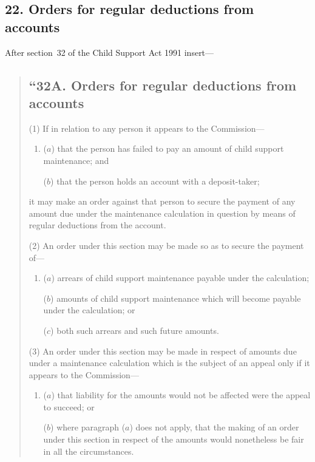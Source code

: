 \documentclass[12pt,a4paper]{article}
\begin{document}

\subsection{22. Orders for regular deductions from accounts}

After section~32 of the Child Support Act 1991 insert---
\begin{quotation}
\subsection*{``32A. Orders for regular deductions from accounts}

(1) If in relation to any person it appears to the Commission---
\begin{enumerate}\item[]
($a$) that the person has failed to pay an amount of child support maintenance;
and

($b$) that the person holds an account with a deposit-taker;
\end{enumerate}
it may make an order against that person to secure the payment of any amount due under the maintenance calculation in question by means of regular deductions from the account.

(2) An order under this section may be made so as to secure the payment of---
\begin{enumerate}\item[]
($a$) arrears of child support maintenance payable under the calculation;

($b$) amounts of child support maintenance which will become payable under the
calculation; or

($c$) both such arrears and such future amounts.
\end{enumerate}

\begin{sloppypar}
(3) An order under this section may be made in respect of amounts due under a maintenance calculation which is the subject of an appeal only if it appears to the Commission---
\end{sloppypar}
\begin{enumerate}\item[]
($a$) that liability for the amounts would not be affected were the appeal to succeed;
or

($b$) where paragraph ($a$) does not apply, that the making of an order under this
section in respect of the amounts would nonetheless be fair in all the
circumstances.
\end{enumerate}


\end{quotation}
\end{document}
